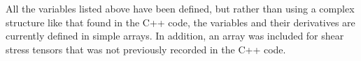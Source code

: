 \documentclass[12pt]{article}
\begin{document}
    All the variables listed above have been defined, but rather than using a complex structure like that found in the C++ code, the variables and their derivatives are currently defined in simple arrays. In addition, an array was included for shear stress tensors that was not previously recorded in the C++ code.
\end{document}
